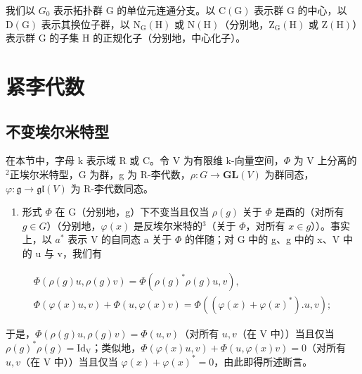 我们以 \(G_{0}\) 表示拓扑群 G 的单位元连通分支。以 \(\mathrm{C(G)}\) 表示群 G 的中心，以 \(\mathrm{D(G)}\) 表示其换位子群，以 \(\mathrm{N_{G}(H)}\) 或 \(\mathrm{N(H)}\)（分别地，\(\mathrm{Z_{G}(H)}\) 或 \(\mathrm{Z(H)}\)）表示群 G 的子集 H 的正规化子（分别地，中心化子）。

\section{紧李代数}

\subsection{不变埃尔米特型}

在本节中，字母 k 表示域 R 或 C。令 V 为有限维 k-向量空间，\(\Phi\) 为 V 上分离的\(^{2}\)正埃尔米特型，G 为群，g 为 R-李代数，\(\rho: G \to \mathbf{GL}(V)\) 为群同态，\(\varphi: \mathfrak{g} \to \mathfrak{gl}(V)\) 为 R-李代数同态。

\begin{enumerate}
\def\labelenumi{\alph{enumi})}
\tightlist
\item
  形式 \(\Phi\) 在 G（分别地，g）下不变当且仅当 \(\rho(g)\) 关于 \(\Phi\) 是酉的（对所有 \(g \in G\)）（分别地，\(\varphi(x)\) 是反埃尔米特的\(^{3}\)（关于 \(\Phi\)，对所有 \(x \in g\)））。事实上，以 \(a^{*}\) 表示 V 的自同态 a 关于 \(\Phi\) 的伴随；对 G 中的 g、g 中的 x、V 中的 u 与 v，我们有
\end{enumerate}

\[
\begin{array}{c} \Phi (\rho (g) u, \rho (g) v) = \Phi (\rho (g) ^ {*} \rho (g) u, v), \\ \Phi (\varphi (x) u, v) + \Phi (u, \varphi (x) v) = \Phi ((\varphi (x) + \varphi (x) ^ {*}). u, v); \end{array}
\]

于是，\(\Phi(\rho(g)u,\rho(g)v)=\Phi(u,v)\)（对所有 \(u,v\)（在 V 中））当且仅当 \(\rho(g)^{*}\rho(g)=\mathrm{Id}_{\mathrm{V}}\)；类似地，\(\Phi(\varphi(x)u,v)+\Phi(u,\varphi(x)v)=0\)（对所有 \(u,v\)（在 V 中））当且仅当 \(\varphi(x)+\varphi(x)^{*}=0\)，由此即得所述断言。

